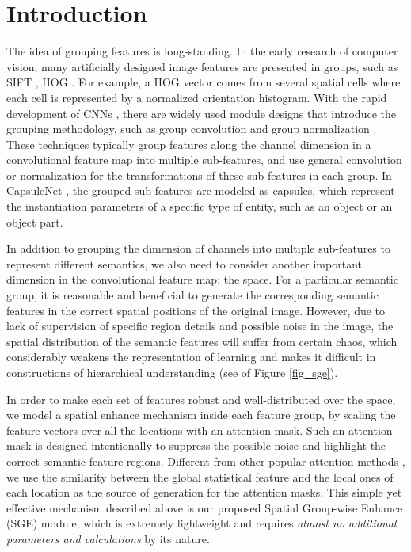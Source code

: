 \documentclass{article}
\begin{document}
	\section{Introduction}
	The idea of grouping features is long-standing. In the early research of computer vision, many artificially designed image features are presented in groups, such as SIFT \cite{lowe2004distinctive}, HOG \cite{dalal2005histograms}. For example, a HOG vector comes from several spatial cells where each cell is represented by a normalized orientation histogram. With the rapid development of CNNs \cite{lecun1990handwritten,krizhevsky2012imagenet,simonyan2014very,szegedy2015going,he2016deep,huang2017densely,wang2018mixed}, there are widely used module designs that introduce the grouping methodology, such as group convolution \cite{xie2017aggregated} and group normalization \cite{wu2018group}. These techniques typically group features along the channel dimension in a convolutional feature map into multiple sub-features, and use general convolution or normalization for the transformations of these sub-features in each group. In CapsuleNet \cite{sabour2017dynamic}, the grouped sub-features are modeled as capsules, which represent the instantiation parameters of a specific type of entity, such as an object or an object part.
	
	In addition to grouping the dimension of channels into multiple sub-features to represent different semantics, we also need to consider another important dimension in the convolutional feature map: the space. For a particular semantic group, it is reasonable and beneficial to generate the corresponding semantic features in the correct spatial positions of the original image. However, due to lack of supervision of specific region details and possible noise in the image, the spatial distribution of the semantic features will suffer from certain chaos, which considerably weakens the representation of learning and makes it difficult in constructions of hierarchical understanding (see  of Figure \ref{fig_sge}).
	
	In order to make each set of features robust and well-distributed over the space, we model a spatial enhance mechanism inside each feature group, by scaling the feature vectors over all the locations with an attention mask. Such an attention mask is designed intentionally to suppress the possible noise and highlight the correct semantic feature regions. Different from other popular attention methods \cite{wang2017residual,hu2018squeeze,li2019selective,park2018bam,woo2018cbam}, we use the similarity between the global statistical feature and the local ones of each location as the source of generation for the attention masks. This simple yet effective mechanism described above is our proposed Spatial Group-wise Enhance (SGE) module, which is extremely lightweight and requires \emph{almost no additional parameters and calculations} by its nature.
	
\end{document}
